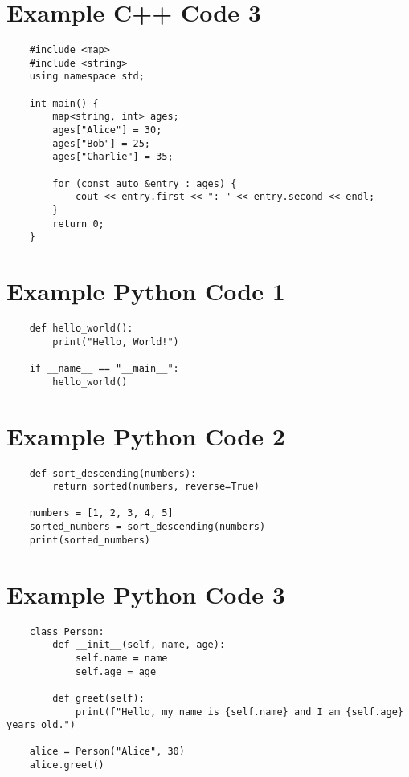 \documentclass[a4paper, landscape, 9pt]{jarticle} %
\begin{document}
\begin{multicols*}{3}
    \section*{Example C++ Code 3}
    \begin{lstlisting}
    #include <map>
    #include <string>
    using namespace std;

    int main() {
        map<string, int> ages;
        ages["Alice"] = 30;
        ages["Bob"] = 25;
        ages["Charlie"] = 35;

        for (const auto &entry : ages) {
            cout << entry.first << ": " << entry.second << endl;
        }
        return 0;
    }
    \end{lstlisting}


    \lstset{style=python}

    \section*{Example Python Code 1}
    \begin{lstlisting}
    def hello_world():
        print("Hello, World!")

    if __name__ == "__main__":
        hello_world()
    \end{lstlisting}

    \section*{Example Python Code 2}
    \begin{lstlisting}
    def sort_descending(numbers):
        return sorted(numbers, reverse=True)

    numbers = [1, 2, 3, 4, 5]
    sorted_numbers = sort_descending(numbers)
    print(sorted_numbers)
    \end{lstlisting}

    \section*{Example Python Code 3}
    \begin{lstlisting}
    class Person:
        def __init__(self, name, age):
            self.name = name
            self.age = age

        def greet(self):
            print(f"Hello, my name is {self.name} and I am {self.age} years old.")

    alice = Person("Alice", 30)
    alice.greet()
    \end{lstlisting}

\end{multicols*}
\end{document}
